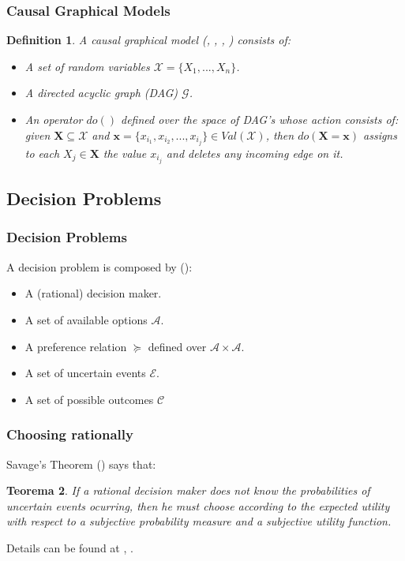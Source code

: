 \documentclass{beamer}
\theoremstyle{plain}
\newtheorem{teo}{Teorema}
\newtheorem{defi}[teo]{Definition}
\begin{document}
	\begin{frame}
	\frametitle{Causal Graphical Models}
	\begin{defi}
	A causal graphical model (\cite{spirtes2000causation}, \cite{pearl2009causality}, \cite{koller2003multi}, \cite{sucar2015probabilistic}) consists of:
	\begin{itemize}
	 \item A set of random variables $\mathcal{X}=\{ X_1,...,X_n \}$.
	 \item A directed acyclic graph (DAG) $\mathcal{G}$.
	 \item An operator $do()$ defined over the space of DAG's whose action consists of: given $\mathbf{X} \subseteq \mathcal{X}$ and $\mathbf{x} = \{ x_{i_1}, x_{i_2}, ... , x_{i_j} \} \in Val(\mathcal{X})$, then $do(\mathbf{X} = \mathbf{x} )$ assigns to each $X_j \in \mathbf{X}$ the value $x_{i_j}$ and deletes any incoming edge on it.
	 \end{itemize}
	 \end{defi}
	 \end{frame}

\subsection{Decision Problems}
	\begin{frame}
	\frametitle{Decision Problems}
	A decision problem is composed by (\cite{bernardo2000bayesian}):
	\begin{itemize}
	\item A (rational) decision maker.
	\item A set of available options $\mathcal{A}$.
	\item A preference relation $\succeq$ defined over $\mathcal{A} \times \mathcal{A}$.
	\item A set of uncertain events $\mathcal{E}$.
    \item A set of possible outcomes $\mathcal{C}$
	\end{itemize}
	\end{frame}
	
	\begin{frame}
	\frametitle{Choosing rationally}
	Savage's Theorem (\cite{savage1954the}) says that:
\begin{teo}	
	If a rational decision maker does not know the probabilities of uncertain events ocurring, then he must choose according to the expected utility with respect to a \textit{subjective} probability measure and a \textit{subjective} utility function.
\end{teo}
Details can be found at \cite{bernardo2000bayesian}, \cite{gilboa2009decision}.
	\end{frame}
\end{document}
